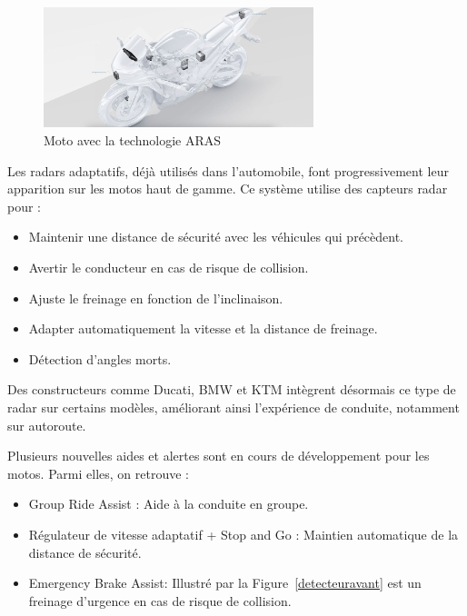 \begin{figure}[H]
    \centering
    \includegraphics[width=0.7\textwidth]{images/aras_moto.jpeg} 
    \caption{Moto avec la technologie ARAS}
\end{figure}

Les radars adaptatifs, déjà utilisés dans l’automobile, font progressivement leur apparition sur les motos haut de gamme. Ce système utilise des capteurs radar pour :
\begin{itemize}
    \item Maintenir une distance de sécurité avec les véhicules qui précèdent.
    \item Avertir le conducteur en cas de risque de collision.
    \item Ajuste le freinage en fonction de l'inclinaison.
    \item Adapter automatiquement la vitesse et la distance de freinage.
    \item Détection d'angles morts.
\end{itemize}
Des constructeurs comme Ducati, BMW et KTM intègrent désormais ce type de radar sur certains modèles, améliorant ainsi l’expérience de conduite, notamment sur autoroute.

Plusieurs nouvelles aides et alertes sont en cours de développement pour les motos. Parmi elles, on retrouve :
\begin{itemize}
    \item Group Ride Assist : Aide à la conduite en groupe.
    \item Régulateur de vitesse adaptatif + Stop and Go : Maintien automatique de la distance de sécurité.
    \item Emergency Brake Assist: Illustré par la Figure~\ref{detecteuravant} est un freinage d’urgence en cas de risque de collision.
\end{itemize}

